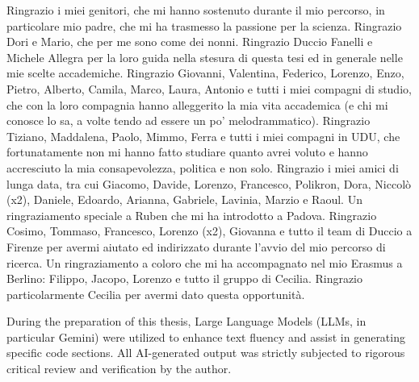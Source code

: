 
Ringrazio i miei genitori, che mi hanno sostenuto durante il mio percorso, in particolare mio padre, che mi ha trasmesso la passione per la scienza.
Ringrazio Dori e Mario, che per me sono come dei nonni.
\newline
Ringrazio Duccio Fanelli e Michele Allegra per la loro guida nella stesura di questa tesi ed in generale nelle mie scelte accademiche.
\newline
Ringrazio Giovanni, Valentina, Federico, Lorenzo, Enzo, Pietro, Alberto, Camila, Marco, Laura, Antonio e tutti i miei compagni di studio, che con la loro compagnia hanno alleggerito la mia vita accademica (e chi mi conosce lo sa, a volte tendo ad essere un po’ melodrammatico).
\newline
Ringrazio Tiziano, Maddalena, Paolo, Mimmo, Ferra e tutti i miei compagni in UDU, che fortunatamente non mi hanno fatto studiare quanto avrei voluto e hanno accresciuto la mia consapevolezza, politica e non solo.
\newline
Ringrazio i miei amici di lunga data, tra cui Giacomo, Davide, Lorenzo, Francesco, Polikron, Dora, Niccolò (x2), Daniele, Edoardo, Arianna, Gabriele, Lavinia, Marzio e Raoul. Un ringraziamento speciale a Ruben che mi ha introdotto a Padova.
\newline
Ringrazio Cosimo, Tommaso, Francesco, Lorenzo (x2), Giovanna e tutto il team di Duccio a Firenze per avermi aiutato ed indirizzato durante l’avvio del mio percorso di ricerca. 
\newline
Un ringraziamento a coloro che mi ha accompagnato nel mio Erasmus a Berlino: Filippo, Jacopo, Lorenzo e tutto il gruppo di Cecilia. Ringrazio particolarmente Cecilia per avermi dato questa opportunità.
\newline
\newpage


During the preparation of this thesis, Large Language Models (LLMs, in particular Gemini) were utilized to enhance text fluency and assist in generating specific code sections. All AI-generated output was strictly subjected to rigorous critical review and verification by the author.
